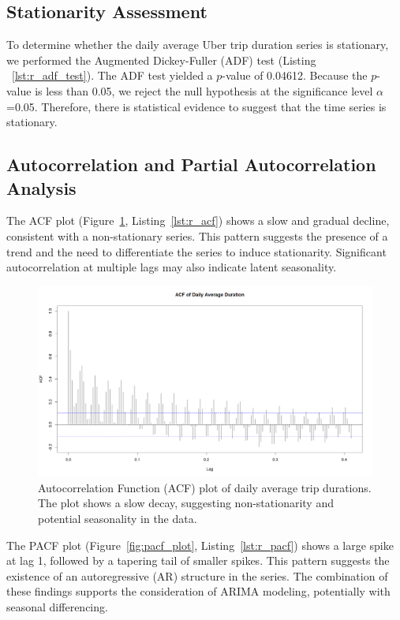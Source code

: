 \documentclass{article}
\begin{document}
\subsection{Stationarity Assessment}
To determine whether the daily average Uber trip duration series is stationary, we performed the Augmented Dickey-Fuller (ADF) test (Listing ~\ref{lst:r_adf_test}). The ADF test yielded a $p$-value of 0.04612. Because the $p$-value is less than 0.05, we reject the null hypothesis at the significance level $\alpha$=0.05. Therefore, there is statistical evidence to suggest that the time series is stationary.

\subsection{Autocorrelation and Partial Autocorrelation Analysis}
The ACF plot (Figure~\ref{fig:acf_plot}, Listing~\ref{lst:r_acf}) shows a slow and gradual decline, consistent with a non-stationary series. This pattern suggests the presence of a trend and the need to differentiate the series to induce stationarity. Significant autocorrelation at multiple lags may also indicate latent seasonality.

\begin{figure}
  \includegraphics[width=\textwidth]{finalproject/images/acf-plot.png}
  \caption{Autocorrelation Function (ACF) plot of daily average trip durations. The plot shows a slow decay, suggesting non-stationarity and potential seasonality in the data.}
  \label{fig:acf_plot}
\end{figure}

The PACF plot (Figure~\ref{fig:pacf_plot}, Listing~\ref{lst:r_pacf}) shows a large spike at lag 1, followed by a tapering tail of smaller spikes. This pattern suggests the existence of an autoregressive (AR) structure in the series. The combination of these findings supports the consideration of ARIMA modeling, potentially with seasonal differencing.
\end{document}
